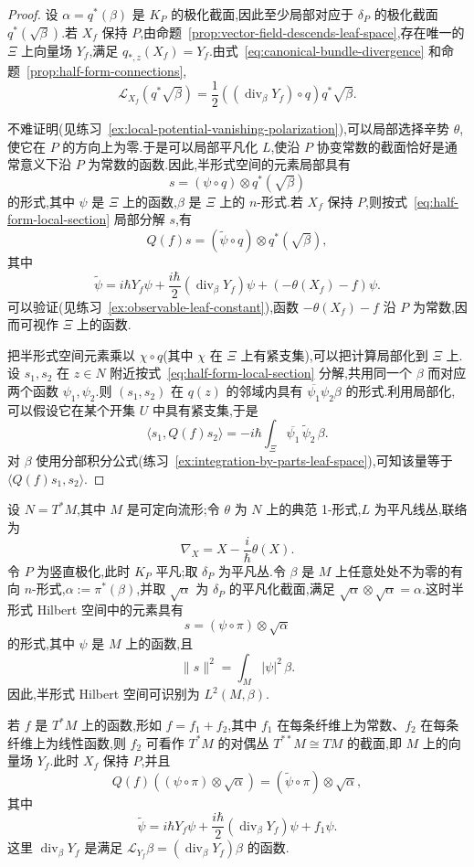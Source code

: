 \begin{proof}
设 $\alpha=q^*(\beta)$ 是 $K_P$ 的极化截面,因此至少局部对应于 $\delta_P$ 的极化截面 $q^*(\sqrt\beta)$.若 $X_f$ 保持 $P$,由命题~\ref{prop:vector-field-descends-leaf-space},存在唯一的 $\Xi$ 上向量场 $Y_f$,满足 $q_{*,z}(X_f)=Y_f$.由式~\eqref{eq:canonical-bundle-divergence} 和命题~\ref{prop:half-form-connections},
\[
 \mathcal L_{X_f}(q^*\sqrt\beta)
 =\frac12((\operatorname{div}_\beta Y_f)\circ q)q^*\sqrt\beta.
\]

不难证明(见练习~\ref{ex:local-potential-vanishing-polarization}),可以局部选择辛势 $\theta$,使它在 $P$ 的方向上为零.于是可以局部平凡化 $L$,使沿 $P$ 协变常数的截面恰好是通常意义下沿 $P$ 为常数的函数.因此,半形式空间的元素局部具有
\[
 s=(\psi\circ q)\otimes q^*(\sqrt\beta)
 \label{eq:half-form-local-section}
\]
的形式,其中 $\psi$ 是 $\Xi$ 上的函数,$\beta$ 是 $\Xi$ 上的 $n$-形式.若 $X_f$ 保持 $P$,则按式~\eqref{eq:half-form-local-section} 局部分解 $s$,有
\[
 Q(f)s=(\widetilde\psi\circ q)\otimes q^*(\sqrt\beta),
\]
其中
\[
 \widetilde\psi=i\hbar Y_f\psi
 +\frac{i\hbar}{2}(\operatorname{div}_\beta Y_f)\psi
 +(-\theta(X_f)-f)\psi.
 \label{eq:half-form-local-action}
\]
可以验证(见练习~\ref{ex:observable-leaf-constant}),函数 $-\theta(X_f)-f$ 沿 $P$ 为常数,因而可视作 $\Xi$ 上的函数.

把半形式空间元素乘以 $\chi\circ q$(其中 $\chi$ 在 $\Xi$ 上有紧支集),可以把计算局部化到 $\Xi$ 上.设 $s_1,s_2$ 在 $z\in N$ 附近按式~\eqref{eq:half-form-local-section} 分解,共用同一个 $\beta$ 而对应两个函数 $\psi_1,\psi_2$.则 $(s_1,s_2)$ 在 $q(z)$ 的邻域内具有 $\overline{\psi_1}\psi_2\beta$ 的形式.利用局部化,可以假设它在某个开集 $U$ 中具有紧支集,于是
\[
 \langle s_1,Q(f)s_2\rangle=-i\hbar\int_\Xi \overline{\psi_1}\,\widetilde\psi_2\,\beta.
\]
对 $\beta$ 使用分部积分公式(练习~\ref{ex:integration-by-parts-leaf-space}),可知该量等于 $\langle Q(f)s_1,s_2\rangle$.
\end{proof}

\begin{example}[余切丛上的半形式量子化]
\label{ex:cotangent-bundle-half-form}
设 $N=T^*M$,其中 $M$ 是可定向流形;令 $\theta$ 为 $N$ 上的典范 1-形式,$L$ 为平凡线丛,联络为
\[
 \nabla_X=X-\frac{i}{\hbar}\theta(X).
\]
令 $P$ 为竖直极化,此时 $K_P$ 平凡;取 $\delta_P$ 为平凡丛.令 $\beta$ 是 $M$ 上任意处处不为零的有向 $n$-形式,$\alpha:=\pi^*(\beta)$,并取 $\sqrt\alpha$ 为 $\delta_P$ 的平凡化截面,满足 $\sqrt\alpha\otimes\sqrt\alpha=\alpha$.这时半形式 Hilbert 空间中的元素具有
\[
 s=(\psi\circ\pi)\otimes\sqrt\alpha
\]
的形式,其中 $\psi$ 是 $M$ 上的函数,且
\[
 \|s\|^2=\int_M|\psi|^2\,\beta.
\]
因此,半形式 Hilbert 空间可识别为 $L^2(M,\beta)$.

若 $f$ 是 $T^*M$ 上的函数,形如 $f=f_1+f_2$,其中 $f_1$ 在每条纤维上为常数、$f_2$ 在每条纤维上为线性函数,则 $f_2$ 可看作 $T^*M$ 的对偶丛 $T^{**}M\cong TM$ 的截面,即 $M$ 上的向量场 $Y_f$.此时 $X_f$ 保持 $P$,并且
\[
 Q(f)((\psi\circ\pi)\otimes\sqrt\alpha)
 =(\widetilde\psi\circ\pi)\otimes\sqrt\alpha,
\]
其中
\[
 \widetilde\psi=i\hbar Y_f\psi
 +\frac{i\hbar}{2}(\operatorname{div}_\beta Y_f)\psi+f_1\psi.
\]
这里 $\operatorname{div}_\beta Y_f$ 是满足 $\mathcal L_{Y_f}\beta=(\operatorname{div}_\beta Y_f)\beta$ 的函数.
\end{example}


